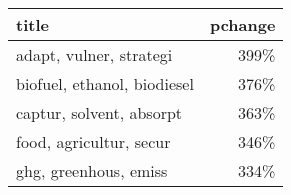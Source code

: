 \begin{tabular}{p{1.2cm}r}
\toprule
                       title &  pchange \\
\midrule
     adapt, vulner, strategi &     399\% \\
 biofuel, ethanol, biodiesel &     376\% \\
    captur, solvent, absorpt &     363\% \\
     food, agricultur, secur &     346\% \\
       ghg, greenhous, emiss &     334\% \\
\bottomrule
\end{tabular}
